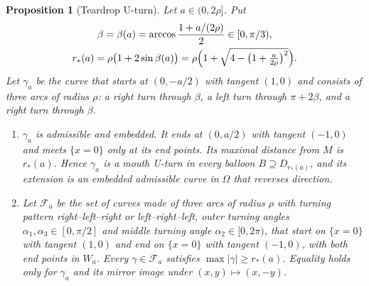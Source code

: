 \documentclass[11pt,reqno]{amsart}
\newtheorem{proposition}[theorem]{Proposition}
\theoremstyle{definition}
\numberwithin{equation}{section}
\begin{document}
\begin{proposition}[Teardrop U-turn]
\label{prop:teardrop}
Let $a\in(0,2\rho]$. Put
\begin{gather*}
\beta=\beta(a)=\arccos\frac{1+a/(2\rho)}{2}\in[0,\pi/3),\\
r_*(a)=\rho\bigl(1+2\sin\beta(a)\bigr)=\rho\Bigl(1+\sqrt{4-\bigl(1+\tfrac{a}{2\rho}\bigr)^2}\Bigr).
\end{gather*}
Let $\gamma_a$ be the curve that starts at $(0,-a/2)$ with tangent $(1,0)$ and consists of three arcs of radius $\rho$: a right turn through $\beta$, a left turn through $\pi+2\beta$, and a right turn through $\beta$.
\begin{enumerate}
\item[(i)] $\gamma_a$ is admissible and embedded. It ends at $(0,a/2)$ with tangent $(-1,0)$ and meets $\{x=0\}$ only at its end points. Its maximal distance from $M$ is $r_*(a)$. Hence $\gamma_a$ is a mouth U-turn in every balloon $B\supseteq D_{r_*(a)}$, and its extension is an embedded admissible curve in $\Omega$ that reverses direction.
\item[(ii)] Let $\mathcal F_a$ be the set of curves made of three arcs of radius $\rho$ with turning pattern right--left--right or left--right--left, outer turning angles $\alpha_1,\alpha_3\in[0,\pi/2]$ and middle turning angle $\alpha_2\in[0,2\pi)$, that start on $\{x=0\}$ with tangent $(1,0)$ and end on $\{x=0\}$ with tangent $(-1,0)$, with both end points in $W_a$. Every $\gamma\in\mathcal F_a$ satisfies $\max|\gamma|\ge r_*(a)$. Equality holds only for $\gamma_a$ and its mirror image under $(x,y)\mapsto(x,-y)$.
\end{enumerate}
\end{proposition}
\end{document}
